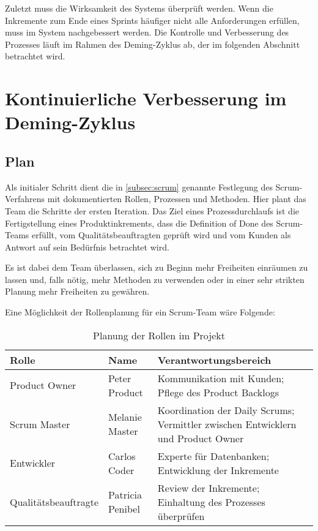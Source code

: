         Zuletzt muss die Wirksamkeit des Systems überprüft werden. Wenn die Inkremente zum Ende eines Sprints häufiger nicht alle Anforderungen erfüllen, muss im System nachgebessert werden. Die Kontrolle und Verbesserung des Prozesses läuft im Rahmen des Deming-Zyklus ab, der im folgenden Abschnitt betrachtet wird.

    \section{Kontinuierliche Verbesserung im Deming-Zyklus}

        \subsection{Plan}

            Als initialer Schritt dient die in \autoref{subsec:scrum} genannte Festlegung des Scrum-Verfahrens mit dokumentierten Rollen, Prozessen und Methoden. Hier plant das Team die Schritte der ersten Iteration. Das Ziel eines Prozessdurchlaufs ist die Fertigstellung eines Produktinkrements, dass die Definition of Done des Scrum-Teams erfüllt, vom Qualitätsbeauftragten geprüft wird und vom Kunden als Antwort auf sein Bedürfnis betrachtet wird.

            Es ist dabei dem Team überlassen, sich zu Beginn mehr Freiheiten einräumen zu lassen und, falls nötig, mehr Methoden zu verwenden oder in einer sehr strikten Planung mehr Freiheiten zu gewähren.

            Eine Möglichkeit der Rollenplanung für ein Scrum-Team wäre Folgende:
            \begin{table}[!htbp]
            \begin{tabularx}{\textwidth}{|l|l|X|}
                \hline
                Rolle & Name & Verantwortungsbereich \\
                \hline
                Product Owner & Peter Product & Kommunikation mit Kunden; Pflege des Product Backlogs \\
                Scrum Master & Melanie Master & Koordination der Daily Scrums; Vermittler zwischen Entwicklern und Product Owner \\
                Entwickler & Carlos Coder & Experte für Datenbanken; Entwicklung der Inkremente \\
                Qualitätsbeauftragte & Patricia Penibel & Review der Inkremente; Einhaltung des Prozesses überprüfen \\
                \hline
            \end{tabularx}
            \caption{Planung der Rollen im Projekt}
            \label{tbl:roles}
            \end{table}

